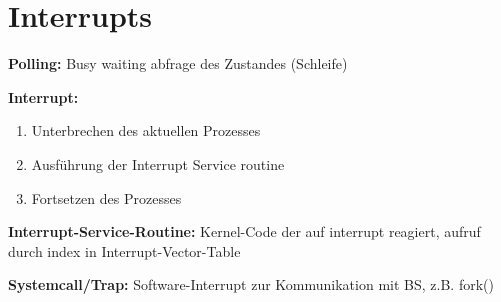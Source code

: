\section*{Interrupts}
\textbf{Polling:} Busy waiting abfrage des Zustandes (Schleife)

\textbf{Interrupt:} 
\begin{enumerate}
\item Unterbrechen des aktuellen Prozesses \item Ausführung der Interrupt Service routine \item Fortsetzen des Prozesses
\end{enumerate}

\textbf{Interrupt-Service-Routine:} Kernel-Code der auf interrupt reagiert, aufruf durch index in Interrupt-Vector-Table

\textbf{Systemcall/Trap: } Software-Interrupt zur Kommunikation mit BS, z.B. fork()

